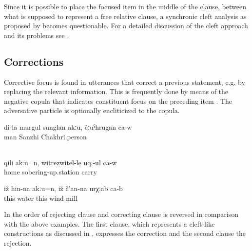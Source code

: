Since it is possible to place the focused item in the middle of the clause, between what is supposed to represent a free relative clause, a synchronic cleft analysis as proposed by \citet{Kazenin2002} becomes questionable. For a detailed discussion of the cleft approach and its problems see \citet{Forker2016a}.


\subsection{Corrections}
\label{ssec:Corrections}

Corrective focus is found in utterances that correct a previous statement, e.g. by replacing the relevant information. This is frequently done by means of the negative copula  that indicates constituent focus on the preceding item . The adversative particle  is optionally encliticized to the copula.
%
\begin{exe}
	\ex	\label{ex:‎My husband is not Sanzhi, he is Chakhri}
	\gll	di-la	murgul	sunglan	akːu,		čːuˁħrugan	ca-w\\
			man	Sanzhi		Chakhri.person	\\
	\glt	{}

	\\\label{ex:No, not home, they take him to the sobering-up station@28}%
	\gll	qili	akːu=n,	witrezwitel-le	uqː-ul	ca-w\\
		home		sobering-up.station	carry	\\
	\glt	{}

	\ex	\label{ex:‎This is not a water, this is a wind mill}
	\gll	iž	hin-na	akːu=n,	iž	č'an-na	urχːab	ca-b\\
		this	water		this	wind	mill	\\
	\glt	{}
\end{exe}

In  the order of rejecting clause and correcting clause is reversed in comparison with the above examples. The first clause, which represents a cleft-like constructions as discussed in , expresses the correction and the second clause the rejection.

